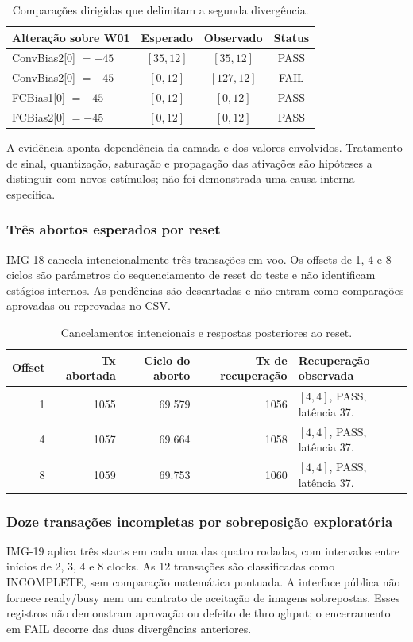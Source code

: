 \documentclass[12pt,a4paper]{article}
\begin{document}
\begin{table}[H]\centering\small
\begin{tabular}{p{9cm}ccc}\toprule
\textbf{Alteração sobre W01} & \textbf{Esperado} & \textbf{Observado} & \textbf{Status}\\\midrule
ConvBias2[0] $=+45$ & $[35,12]$ & $[35,12]$ & PASS\\
ConvBias2[0] $=-45$ & $[0,12]$ & $[127,12]$ & FAIL\\
FCBias1[0] $=-45$ & $[0,12]$ & $[0,12]$ & PASS\\
FCBias2[0] $=-45$ & $[0,12]$ & $[0,12]$ & PASS\\\bottomrule
\end{tabular}
\caption{Comparações dirigidas que delimitam a segunda divergência.}
\end{table}
A evidência aponta dependência da camada e dos valores envolvidos. Tratamento de sinal, quantização, saturação e propagação das ativações são hipóteses a distinguir com novos estímulos; não foi demonstrada uma causa interna específica.

\subsubsection{Três abortos esperados por reset}
IMG-18 cancela intencionalmente três transações em voo. Os offsets de 1, 4 e 8 ciclos são parâmetros do sequenciamento de reset do teste e não identificam estágios internos. As pendências são descartadas e não entram como comparações aprovadas ou reprovadas no CSV.
\begin{table}[H]\centering\small
\begin{tabular}{rrrrp{8cm}}\toprule
\textbf{Offset} & \textbf{Tx abortada} & \textbf{Ciclo do aborto} & \textbf{Tx de recuperação} & \textbf{Recuperação observada}\\\midrule
1 & 1055 & 69.579 & 1056 & $[4,4]$, PASS, latência 37.\\
4 & 1057 & 69.664 & 1058 & $[4,4]$, PASS, latência 37.\\
8 & 1059 & 69.753 & 1060 & $[4,4]$, PASS, latência 37.\\\bottomrule
\end{tabular}
\caption{Cancelamentos intencionais e respostas posteriores ao reset.}
\end{table}

\subsubsection{Doze transações incompletas por sobreposição exploratória}
IMG-19 aplica três starts em cada uma das quatro rodadas, com intervalos entre inícios de 2, 3, 4 e 8 clocks. As 12 transações são classificadas como INCOMPLETE, sem comparação matemática pontuada. A interface pública não fornece ready/busy nem um contrato de aceitação de imagens sobrepostas. Esses registros não demonstram aprovação ou defeito de throughput; o encerramento em FAIL decorre das duas divergências anteriores.
\end{document}
